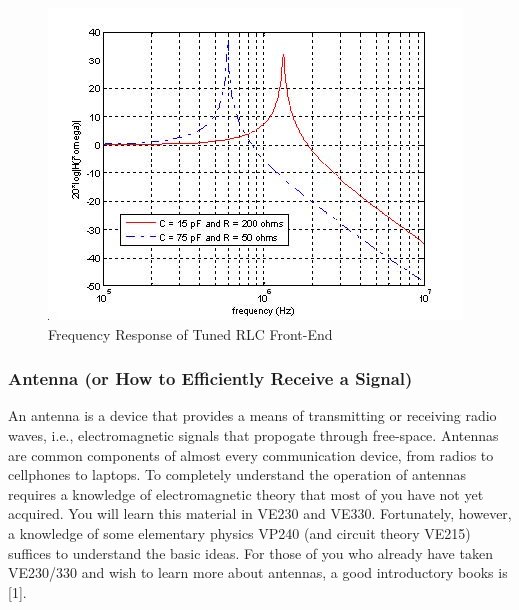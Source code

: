 \documentclass[a4paper]{article}
\begin{document}
\begin{figure}[H]
	\centering
	\includegraphics[width=1\linewidth]{3.jpg}
	\caption{Frequency Response of Tuned RLC Front-End}
\end{figure}
\subsubsection{Antenna (or How to Efficiently Receive a Signal)}
An antenna is a device that provides a means of transmitting or receiving radio waves, i.e., electromagnetic signals that propogate through free-space. Antennas are common components of almost every communication device, from radios to cellphones to laptops. To completely understand the operation of antennas requires a knowledge of electromagnetic theory that most of you have not yet acquired. You will learn this material in VE230 and VE330. Fortunately, however, a knowledge of some elementary physics VP240 (and circuit theory VE215) suffices to understand the basic ideas. For those of you who already have taken VE230/330 and wish to learn more about antennas, a good introductory books is [1].
\end{document}
